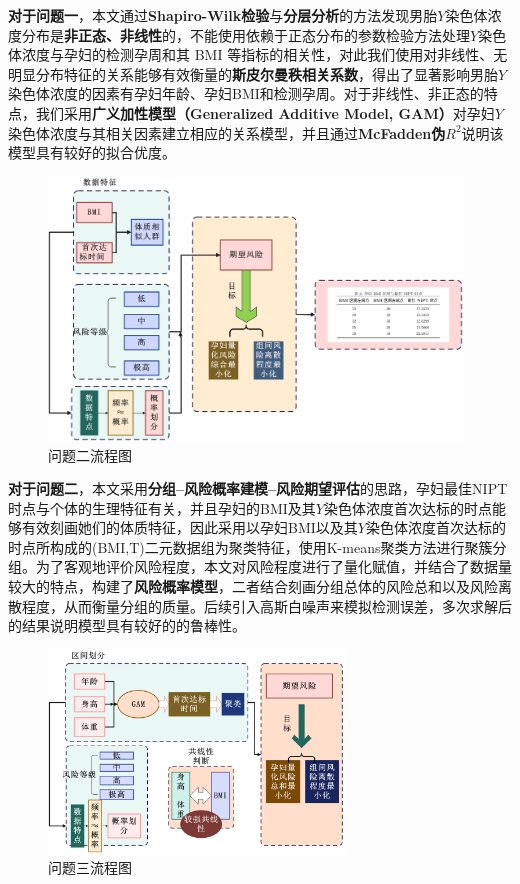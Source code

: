 \documentclass[12pt]{ctexart}
\begin{document}
	\textbf{对于问题一}，本文通过\textbf{Shapiro-Wilk检验}与\textbf{分层分析}的方法发现男胎$Y$染色体浓度分布是\textbf{非正态、非线性}的，不能使用依赖于正态分布的参数检验方法处理$Y$染色体浓度与孕妇的检测孕周和其 BMI 等指标的相关性，对此我们使用对非线性、无明显分布特征的关系能够有效衡量的\textbf{斯皮尔曼秩相关系数}，得出了显著影响男胎$Y$染色体浓度的因素有孕妇年龄、孕妇BMI和检测孕周。对于非线性、非正态的特点，我们采用\textbf{广义加性模型（Generalized Additive Model, GAM）}对孕妇$Y$染色体浓度与其相关因素建立相应的关系模型，并且通过\textbf{McFadden伪$R^2$}说明该模型具有较好的拟合优度。

	\begin{figure}[htbp]
		\centering
		\includegraphics[width=0.98\textwidth]{Q2lc.png} %
		\caption{问题二流程图}
	\end{figure}
	
	\textbf{对于问题二}，本文采用\textbf{分组--风险概率建模--风险期望评估}的思路，孕妇最佳NIPT时点与个体的生理特征有关，并且孕妇的BMI及其$Y$染色体浓度首次达标的时点能够有效刻画她们的体质特征，因此采用以孕妇BMI以及其$Y$染色体浓度首次达标的时点所构成的(BMI,T)二元数据组为聚类特征，使用K-means聚类方法进行聚簇分组。为了客观地评价风险程度，本文对风险程度进行了量化赋值，并结合了数据量较大的特点，构建了\textbf{风险概率模型}，二者结合刻画分组总体的风险总和以及风险离散程度，从而衡量分组的质量。后续引入高斯白噪声来模拟检测误差，多次求解后的结果说明模型具有较好的的鲁棒性。
	
	\begin{figure}[H]
		\centering
		\includegraphics[width=0.7\textwidth]{Q3lc.png} %
		\caption{问题三流程图}
	\end{figure}
\end{document}
